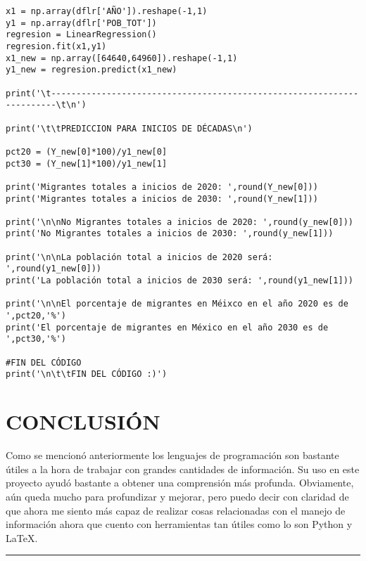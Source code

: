 \documentclass[12pt]{article}
\begin{document}
\begin{verbatim}
x1 = np.array(dflr['AÑO']).reshape(-1,1)
y1 = np.array(dflr['POB_TOT'])
regresion = LinearRegression()
regresion.fit(x1,y1)
x1_new = np.array([64640,64960]).reshape(-1,1)
y1_new = regresion.predict(x1_new)

print('\t-----------------------------------------------------------------------\t\n')

print('\t\tPREDICCION PARA INICIOS DE DÉCADAS\n')

pct20 = (Y_new[0]*100)/y1_new[0]
pct30 = (Y_new[1]*100)/y1_new[1]    

print('Migrantes totales a inicios de 2020: ',round(Y_new[0]))
print('Migrantes totales a inicios de 2030: ',round(Y_new[1]))

print('\n\nNo Migrantes totales a inicios de 2020: ',round(y_new[0]))
print('No Migrantes totales a inicios de 2030: ',round(y_new[1]))

print('\n\nLa población total a inicios de 2020 será: ',round(y1_new[0]))
print('La población total a inicios de 2030 será: ',round(y1_new[1]))

print('\n\nEl porcentaje de migrantes en Méixco en el año 2020 es de ',pct20,'%')
print('El porcentaje de migrantes en México en el año 2030 es de ',pct30,'%')

#FIN DEL CÓDIGO
print('\n\t\tFIN DEL CÓDIGO :)')
\end{verbatim}

\section{\large CONCLUSIÓN}

Como se mencionó anteriormente los lenguajes de programación son bastante útiles a la hora de trabajar con grandes cantidades de información. Su uso en este proyecto ayudó bastante a obtener una comprensión más profunda. Obviamente, aún queda mucho para profundizar y mejorar, pero puedo decir con claridad de que ahora me siento más capaz de realizar cosas relacionadas con el manejo de información ahora que cuento con herramientas tan útiles como lo son Python y LaTeX.

\centering \rule{\textwidth}{1pt} 
\end{document}
